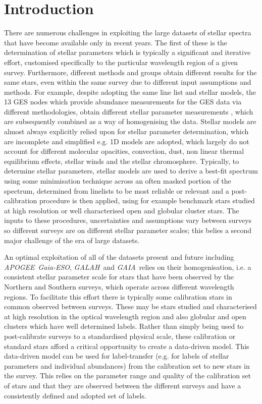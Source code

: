 \documentclass[12pt, preprint]{aastex}
\newcommand{\apogee}{\textsl{APOGEE}}
\newcommand{\galah}{\textsl{GALAH}}
\newcommand{\gaiaeso}{\textsl{Gaia-ESO}}
\newcommand{\gaia}{\textsl{GAIA}}
\begin{document}
\section{Introduction}

There are numerous challenges in exploiting the large datasets of stellar spectra that have become available only in recent years. The first of these is the determination of stellar parameters which is typically a significant and iterative effort, customised specifically to the particular wavelength region of a given survey. Furthermore, different methods and groups obtain different results for the same stars, even within the same survey due to different input assumptions and methods. For example, despite adopting the same line list and stellar models, the 13 GES nodes which provide abundance measurements for the GES data via different methodologies, obtain different stellar parameter measurements  \citep{Smiljanic2014}, which are subsequently combined as a way of homogenising the data.  Stellar models are almost always explicitly relied upon for stellar parameter determination, which are incomplete and simplified e.g. 1D models are adopted, which  largely do not account for different molecular opacities, convection, dust, non linear thermal equilibrium effects, stellar winds and the stellar chromosphere. Typically, to determine stellar parameters, stellar models are used to derive a best-fit spectrum using some minimisation technique across an often masked portion of the spectrum, determined from linelists to be most reliable or relevant and a post-calibration procedure is then applied, using for example benchmark stars studied at high resolution or well characterised open and globular cluster stars. The inputs to these procedures, uncertainties and assumptions vary between surveys so different surveys are on different stellar parameter scales; this belies a second major challenge of the era of large datasets. 

An optimal exploitation of all of the datasets present and future including \apogee\, \gaiaeso, \galah\ and \gaia\ relies on their homogenisation, i.e. a consistent stellar parameter scale for stars that have been observed by the Northern and Southern surveys, which operate across different wavelength regions. To facilitate this effort there is typically some calibration stars in common observed between surveys. These may be stars studied and characterised at high resolution in the optical wavelength region and also globular and open clusters which have well determined labels. Rather than simply being used to post-calibrate surveys to a standardised physical scale, these calibration or standard stars afford a critical opportunity to create a data-driven model.  This data-driven model can be used for label-transfer (e.g. for labels of stellar parameters and individual abundances) from the calibration set to new stars in the survey. This relies on the parameter range and quality of the calibration set of stars and that they are observed between the different surveys and have a consistently defined and adopted set of labels. 
\end{document}
